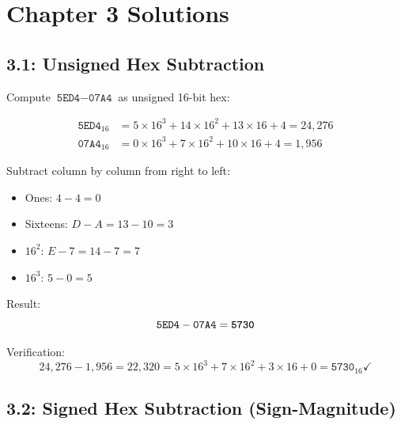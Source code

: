 \newpage
\section*{Chapter 3 Solutions}

\subsection*{3.1: Unsigned Hex Subtraction}
\hypertarget{sol-3.1}{}

Compute $\texttt{5ED4} - \texttt{07A4}$ as unsigned 16-bit hex:

\begin{align*}
  \texttt{5ED4}_{16} &= 5 \times 16^3 + 14 \times 16^2 + 13 \times 16 + 4
                      = 24{,}276 \\
  \texttt{07A4}_{16} &= 0 \times 16^3 + 7 \times 16^2 + 10 \times 16 + 4
                      = 1{,}956
\end{align*}

Subtract column by column from right to left:
\begin{itemize}
  \item Ones: $4 - 4 = 0$
  \item Sixteens: $D - A = 13 - 10 = 3$
  \item $16^2$: $E - 7 = 14 - 7 = 7$
  \item $16^3$: $5 - 0 = 5$
\end{itemize}

Result:
\[ \texttt{5ED4} - \texttt{07A4} = \textbf{\texttt{5730}} \]

Verification:
\[ 24{,}276 - 1{,}956 = 22{,}320 = 5 \times 16^3 + 7 \times 16^2
+ 3 \times 16 + 0 = \texttt{5730}_{16} \checkmark \]

\subsection*{3.2: Signed Hex Subtraction (Sign-Magnitude)}
\hypertarget{sol-3.2}{}

